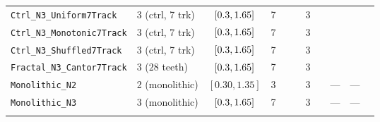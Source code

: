 \begin{table}[!htbp]
{\begin{tabular}{llccccrrrrr}
\texttt{Ctrl\_N3\_Uniform7Track} & 3 (ctrl, 7 trk) & $[0.3{}, 1.65{}]$ & 7 & \NatureCtrlNthreeUniformseventrackFullToothPlanformAreaUmtwo{} & \NatureCtrlNthreeUniformseventrackFullToothPlanformPerimeterUm{} & 3 & \NatureCtrlNthreeUniformseventrackFRepPn{} & \NatureCtrlNthreeUniformseventrackFRepPnPerToothAreaUmtwo{} & \NatureCtrlNthreeUniformseventrackFRepPnPerToothPerimeterUm{} & \NatureCtrlNthreeUniformseventrackFAttPn{} \\
\texttt{Ctrl\_N3\_Monotonic7Track} & 3 (ctrl, 7 trk) & $[0.3{}, 1.65{}]$ & 7 & \NatureCtrlNthreeMonotonicseventrackFullToothPlanformAreaUmtwo{} & \NatureCtrlNthreeMonotonicseventrackFullToothPlanformPerimeterUm{} & 3 & \NatureCtrlNthreeMonotonicseventrackFRepPn{} & \NatureCtrlNthreeMonotonicseventrackFRepPnPerToothAreaUmtwo{} & \NatureCtrlNthreeMonotonicseventrackFRepPnPerToothPerimeterUm{} & \NatureCtrlNthreeMonotonicseventrackFAttPn{} \\
\texttt{Ctrl\_N3\_Shuffled7Track} & 3 (ctrl, 7 trk) & $[0.3{}, 1.65{}]$ & 7 & \NatureCtrlNthreeShuffledseventrackFullToothPlanformAreaUmtwo{} & \NatureCtrlNthreeShuffledseventrackFullToothPlanformPerimeterUm{} & 3 & \NatureCtrlNthreeShuffledseventrackFRepPn{} & \NatureCtrlNthreeShuffledseventrackFRepPnPerToothAreaUmtwo{} & \NatureCtrlNthreeShuffledseventrackFRepPnPerToothPerimeterUm{} & \NatureCtrlNthreeShuffledseventrackFAttPn{} \\
\texttt{Fractal\_N3\_Cantor7Track} & 3 ($28$ teeth) & $[0.3{}, 1.65{}]$ & 7 & \NatureFractalNthreeCantorseventrackFullToothPlanformAreaUmtwo{} & \NatureFractalNthreeCantorseventrackFullToothPlanformPerimeterUm{} & 3 & \NatureFractalNthreeCantorseventrackFRepPn{} & \NatureFractalNthreeCantorseventrackFRepPnPerToothAreaUmtwo{} & \NatureFractalNthreeCantorseventrackFRepPnPerToothPerimeterUm{} & \NatureFractalNthreeCantorseventrackFAttPn{} \\
\texttt{Monolithic\_N2} & 2 (monolithic) & $[0.30, 1.35]$ & 3 & \NatureCantorNtwoHybridrzFullToothPlanformAreaUmtwo{} & \NatureCantorNtwoHybridrzFullToothPlanformPerimeterUm{} & 3 & \CantorNtwoHybridrzBemMonolithicThetathreeFZPn{} & --- & --- & \CantorNtwoHybridrzBemMonolithicThetafoureightFZPn{} \\
\texttt{Monolithic\_N3} & 3 (monolithic) & $[0.3{}, 1.65{}]$ & 7 & \NatureFractalNthreeCantorseventrackFullToothPlanformAreaUmtwo{} & \NatureFractalNthreeCantorseventrackFullToothPlanformPerimeterUm{} & 3 & \FractalNthreeCantorseventrackBemMonolithicThetathreeFZPn{} & --- & --- & \FractalNthreeCantorseventrackBemMonolithicThetafoureightFZPn{} \\
\botrule
\end{tabular}%
}
\end{table}

